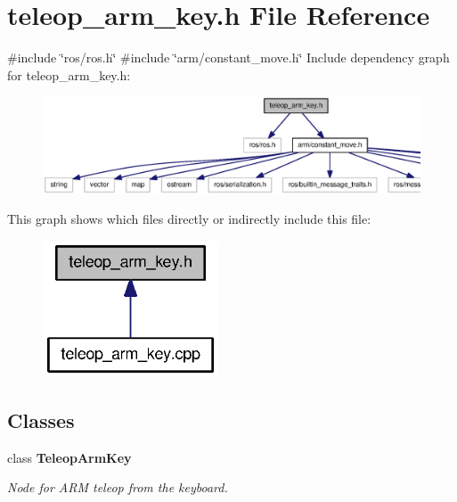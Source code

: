 \section{teleop\-\_\-arm\-\_\-key.\-h \-File \-Reference}
\label{teleop__arm__key_8h}
{\ttfamily \#include \char`\"{}ros/ros.\-h\char`\"{}}\*
{\ttfamily \#include \char`\"{}arm/constant\-\_\-move.\-h\char`\"{}}\*
\-Include dependency graph for teleop\-\_\-arm\-\_\-key.\-h\-:\nopagebreak
\begin{figure}[H]
\begin{center}
\leavevmode
\includegraphics[width=350pt]{teleop__arm__key_8h__incl}
\end{center}
\end{figure}
\-This graph shows which files directly or indirectly include this file\-:\nopagebreak
\begin{figure}[H]
\begin{center}
\leavevmode
\includegraphics[width=148pt]{teleop__arm__key_8h__dep__incl}
\end{center}
\end{figure}
\subsection*{\-Classes}
\begin{DoxyCompactItemize}
\item 
class {\bf \-Teleop\-Arm\-Key}
\begin{DoxyCompactList}\small\item\em \-Node for \-A\-R\-M teleop from the keyboard. \end{DoxyCompactList}\end{DoxyCompactItemize}
